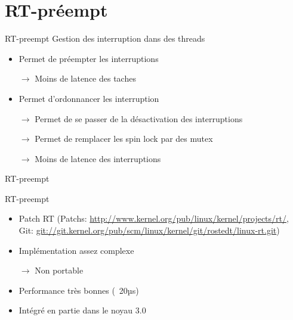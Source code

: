 \section{RT-préempt} %

\begin{frame}{RT-preempt} %
  Gestion des interruption dans des threads
  \begin{itemize}
    \item Permet de préempter les interruptions
    \item[$\to$] Moins de latence des taches
    \item Permet d'ordonnancer les interruption
    \item[$\to$] Permet de se passer de la désactivation des interruptions
    \item[$\to$] Permet de remplacer les spin lock par des mutex
    \item[$\to$] Moins de latence des interruptions
  \end{itemize}
\end{frame}

\begin{frame}{RT-preempt}
  \begin{center}
    
  \end{center}
\end{frame}

\begin{frame}{RT-preempt}
 \begin{itemize}
 \item                 Patch                RT                (Patchs:
   \url{http://www.kernel.org/pub/linux/kernel/projects/rt/},   Git:
   \url{git://git.kernel.org/pub/scm/linux/kernel/git/rostedt/linux-rt.git})
  \item Implémentation assez complexe
  \item[$\to$] Non portable
  \item Performance très bonnes (~20µs)
  \item Intégré en partie dans le noyau 3.0
 \end{itemize}
\end{frame}
